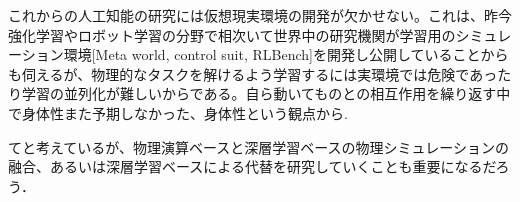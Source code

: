 これからの人工知能の研究には仮想現実環境の開発が欠かせない。これは、昨今強化学習やロボット学習の分野で相次いて世界中の研究機関が学習用のシミュレーション環境[Meta world, control suit, RLBench]を開発し公開していることからも伺えるが、物理的なタスクを解けるよう学習するには実環境では危険であったり学習の並列化が難しいからである。自ら動いてものとの相互作用を繰り返す中で身体性また予期しなかった、身体性という観点から.

てと考えているが、物理演算ベースと深層学習ベースの物理シミュレーションの融合、あるいは深層学習ベースによる代替を研究していくことも重要になるだろう．

